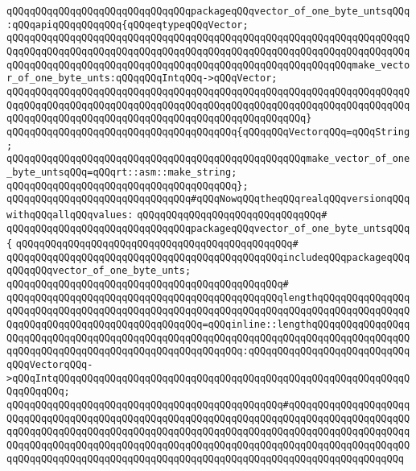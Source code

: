 \verb|qQQqqQQqqQQqqQQqqQQqqQQqqQQqqQQqpackageqQQqvector_of_one_byte_untsqQQq:qQQqapiqQQqqQQqqQQq{qQQqeqtypeqQQqVector;|\newline
\verb|qQQqqQQqqQQqqQQqqQQqqQQqqQQqqQQqqQQqqQQqqQQqqQQqqQQqqQQqqQQqqQQqqQQqqQQqqQQqqQQqqQQqqQQqqQQqqQQqqQQqqQQqqQQqqQQqqQQqqQQqqQQqqQQqqQQqqQQqqQQqqQQqqQQqqQQqqQQqqQQqqQQqqQQqqQQqqQQqqQQqqQQqqQQqqQQqqQQqqQQqmake_vector_of_one_byte_unts:qQQqqQQqIntqQQq->qQQqVector;|\newline
\verb|qQQqqQQqqQQqqQQqqQQqqQQqqQQqqQQqqQQqqQQqqQQqqQQqqQQqqQQqqQQqqQQqqQQqqQQqqQQqqQQqqQQqqQQqqQQqqQQqqQQqqQQqqQQqqQQqqQQqqQQqqQQqqQQqqQQqqQQqqQQqqQQqqQQqqQQqqQQqqQQqqQQqqQQqqQQqqQQqqQQqqQQqqQQqqQQq}|\newline
\verb|qQQqqQQqqQQqqQQqqQQqqQQqqQQqqQQqqQQqqQQq{qQQqqQQqVectorqQQq=qQQqString;|\newline
\verb|qQQqqQQqqQQqqQQqqQQqqQQqqQQqqQQqqQQqqQQqqQQqqQQqqQQqmake_vector_of_one_byte_untsqQQq=qQQqrt::asm::make_string;|\newline
\verb|qQQqqQQqqQQqqQQqqQQqqQQqqQQqqQQqqQQqqQQq};|\newline
\newline
\verb|qQQqqQQqqQQqqQQqqQQqqQQqqQQqqQQq#qQQqNowqQQqtheqQQqrealqQQqversionqQQqwithqQQqallqQQqvalues:|\newline
\verb|qQQqqQQqqQQqqQQqqQQqqQQqqQQqqQQq#|\newline
\verb|qQQqqQQqqQQqqQQqqQQqqQQqqQQqqQQqpackageqQQqvector_of_one_byte_untsqQQq{|\newline
\verb|qQQqqQQqqQQqqQQqqQQqqQQqqQQqqQQqqQQqqQQqqQQqqQQq#|\newline
\verb|qQQqqQQqqQQqqQQqqQQqqQQqqQQqqQQqqQQqqQQqqQQqqQQqincludeqQQqpackageqQQqqQQqqQQqvector_of_one_byte_unts;|\newline
\verb|qQQqqQQqqQQqqQQqqQQqqQQqqQQqqQQqqQQqqQQqqQQqqQQq#|\newline
\verb|qQQqqQQqqQQqqQQqqQQqqQQqqQQqqQQqqQQqqQQqqQQqqQQqlengthqQQqqQQqqQQqqQQqqQQqqQQqqQQqqQQqqQQqqQQqqQQqqQQqqQQqqQQqqQQqqQQqqQQqqQQqqQQqqQQqqQQqqQQqqQQqqQQqqQQqqQQqqQQqqQQqqQQqqQQq=qQQqinline::lengthqQQqqQQqqQQqqQQqqQQqqQQqqQQqqQQqqQQqqQQqqQQqqQQqqQQqqQQqqQQqqQQqqQQqqQQqqQQqqQQqqQQqqQQqqQQqqQQqqQQqqQQqqQQqqQQqqQQqqQQqqQQqqQQq:qQQqqQQqqQQqqQQqqQQqqQQqqQQqqQQqVectorqQQq->qQQqIntqQQqqQQqqQQqqQQqqQQqqQQqqQQqqQQqqQQqqQQqqQQqqQQqqQQqqQQqqQQqqQQqqQQqqQQq;|\newline
\verb|qQQqqQQqqQQqqQQqqQQqqQQqqQQqqQQqqQQqqQQqqQQqqQQq#qQQqqQQqqQQqqQQqqQQqqQQqqQQqqQQqqQQqqQQqqQQqqQQqqQQqqQQqqQQqqQQqqQQqqQQqqQQqqQQqqQQqqQQqqQQqqQQqqQQqqQQqqQQqqQQqqQQqqQQqqQQqqQQqqQQqqQQqqQQqqQQqqQQqqQQqqQQqqQQqqQQqqQQqqQQqqQQqqQQqqQQqqQQqqQQqqQQqqQQqqQQqqQQqqQQqqQQqqQQqqQQqqQQqqQQqqQQqqQQqqQQqqQQqqQQqqQQqqQQqqQQqqQQqqQQqqQQqqQQqqQQqqQQqqQQqqQQqqQQq|\newline
